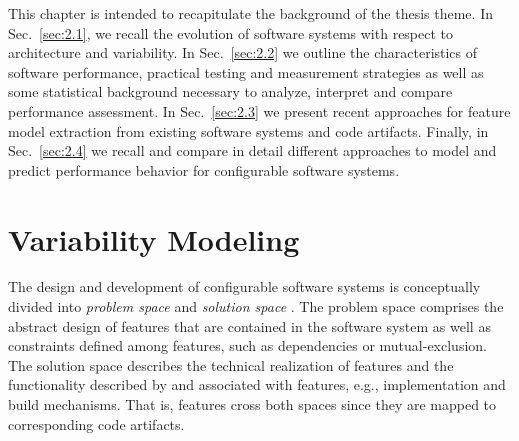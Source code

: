 {\color{red}
This chapter is intended to recapitulate the background of the thesis theme. In
Sec.~\ref{sec:2.1}, we recall the evolution of software systems with respect to
architecture and variability. In Sec.~\ref{sec:2.2} we outline the characteristics
of software performance, practical testing and measurement strategies as well as
some statistical background necessary to analyze, interpret and compare
performance assessment. In Sec.~\ref{sec:2.3} we present recent approaches for
feature model extraction from existing software systems and code artifacts. Finally, in
Sec.~\ref{sec:2.4} we recall and compare in detail different approaches to model
and predict performance behavior for configurable software systems.
}

\section{Variability Modeling}
The design and development of configurable software systems is conceptually
divided into \emph{problem space} and \emph{solution space} \citep{czarnecki_generative_2000}. The problem space
comprises the abstract design of features that are contained in the software system as well as
constraints defined among features, such as dependencies or mutual-exclusion.
The solution space describes the technical realization of features and the
functionality described by and associated with features, e.g., implementation
and build mechanisms. That is, features cross both spaces since they are mapped
to corresponding code artifacts.

